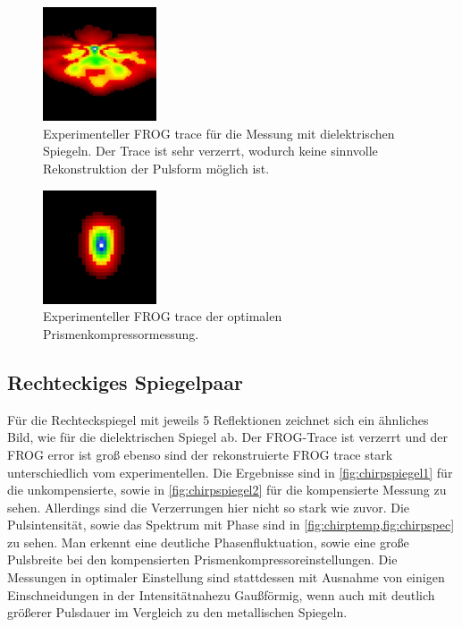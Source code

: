 \documentclass[twoside,        %
               BCOR12mm,       %
               english,ngerman, %
               fleqn,headsepline=false,footsepline=false
              ]{Vorlage/MFPREPORT}
\begin{document}
\begin{figure}[]
    \centering
    \includegraphics[width=0.3\textwidth]{diel.jpg}
    \caption{Experimenteller FROG trace für die Messung mit dielektrischen
    Spiegeln. Der Trace ist sehr verzerrt, wodurch keine sinnvolle
Rekonstruktion der Pulsform möglich ist. }
    \label{fig:diel}
\end{figure}
\begin{figure}[]
    \centering
    \includegraphics[width=0.3\textwidth]{opttrace.jpg}
    \caption{Experimenteller FROG trace der optimalen Prismenkompressormessung.}
    \label{fig:opttrace}
\end{figure}

\subsection{Rechteckiges Spiegelpaar}
Für die Rechteckspiegel mit jeweils 5 Reflektionen zeichnet sich ein ähnliches
Bild, wie für die dielektrischen Spiegel ab. Der FROG-Trace ist verzerrt
und der FROG error ist groß ebenso sind der rekonstruierte FROG trace stark
unterschiedlich vom experimentellen. Die Ergebnisse sind in \cref{fig:chirpspiegel1}
für die unkompensierte, sowie in \cref{fig:chirpspiegel2} für die kompensierte
Messung zu sehen. Allerdings sind die Verzerrungen hier nicht so stark wie
zuvor. Die Pulsintensität, sowie das Spektrum mit Phase sind in
\cref{fig:chirptemp,fig:chirpspec} zu sehen. Man erkennt eine deutliche
Phasenfluktuation, sowie eine große Pulsbreite bei den kompensierten
Prismenkompressoreinstellungen. Die Messungen in optimaler Einstellung sind
stattdessen mit Ausnahme von einigen Einschneidungen in der Intensitätnahezu
Gaußförmig, wenn auch mit deutlich größerer Pulsdauer im Vergleich zu den 
metallischen Spiegeln.
\end{document}
